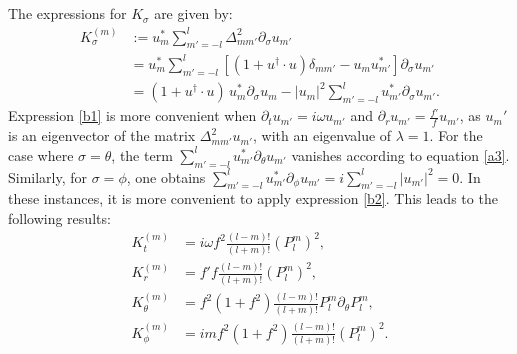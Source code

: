 \documentclass[aps,prd,superscriptaddress,notitlepage,11pt,final,longbibliography,nofootinbib]{revtex4-1}
\numberwithin{equation}{section}
\begin{document}
\section{}
\label{appendB}
The expressions for $K_{\sigma}$ are given by:
\begin{align} 
K^{(m)}_{\sigma}&:=u^*_m\sum_{m'=-l}^l \Delta^2_{mm'}\partial_{\sigma}u_{m'}\label{b1}\\
&=u^*_m\sum_{m'=-l}^l \left[(1+u^{\dagger}\cdot u)\delta_{mm'}-u_mu^*_{m'}\right]\partial_{\sigma}u_{m'}\nonumber\\
&=(1+u^{\dagger}\cdot u)\,u_m^*\partial_{\sigma}u_{m}-|u_m|^2\sum_{m'=-l}^lu_{m'}^*\partial_{\sigma}u_{m'}.\label{b2}
\end{align}
Expression  \eqref{b1}  is more convenient when $\partial_tu_{m'}=i\omega u_{m'}$ and $\partial_{r}u_{m'}=\frac{f'}{f} u_{m'}$, as $u_m'$ is an eigenvector of the matrix $\Delta^2_{mm'}u_{m'}$, with an eigenvalue of $\lambda=1$. For the case where $\sigma=\theta$, the term $\sum_{m'=-l}^lu_{m'}^*\partial_{\theta}u_{m'}$ vanishes according to equation  \eqref{a3}. Similarly, for $\sigma=\phi$, one obtains  $\sum_{m'=-l}^lu_{m'}^*\partial_{\phi}u_{m'}=i\sum_{m'=-l}^l |u_{m'}|^2=0$. In these instances, it is more convenient to apply expression \eqref{b2}. This leads to the following results:
\begin{align}
K^{(m)}_t&=i\omega f^2\frac{(l-m)!}{(l+m)!}(P^m_l)^2,\nonumber\\
K^{(m)}_r&=f'f\frac{(l-m)!}{(l+m)!}(P^m_l)^2,\nonumber\\
K^{(m)}_{\theta}&= f^2(1+f^2)\frac{(l-m)!}{(l+m)!}P^m_l\partial_{\theta}P^m_l,\nonumber\\
K^{(m)}_{\phi}&=im f^2(1+f^2)\frac{(l-m)!}{(l+m)!}(P^m_l)^2.\nonumber
\end{align}  


\section{}
\label{appendC}
\end{document}
